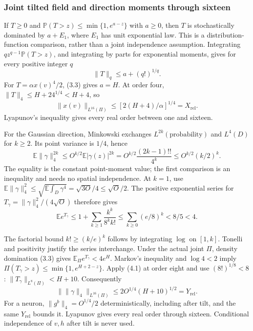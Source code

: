 \documentclass[11pt]{article}
\theoremstyle{plain}
\theoremstyle{definition}
\theoremstyle{remark}
\newcommand{\E}{\mathbb{E}}
\newcommand{\PP}{\mathbb{P}}
\begin{document}
\subsubsection{Joint tilted field and direction moments through sixteen}
If $T\ge0$ and $\PP(T>z)\le\min\{1,e^{a-z}\}$ with $a\ge0$, then
$T$ is stochastically dominated by $a+E_1$, where $E_1$ has unit
exponential law. This is a distribution-function comparison, rather than
a joint independence assumption. Integrating
$qz^{q-1}\PP(T>z)$, and integrating by parts for exponential moments,
gives for every positive integer $q$
\begin{equation}\|T\|_q\le a+(q!)^{1/q}.\tag{4.1}\end{equation}
For $T=\alpha x(v)^4/2$, (3.3) gives $a=H$. At order four,
$\|T\|_4\le H+24^{1/4}<H+4$, so
\begin{equation}
 \|x(v)\|_{L^{16}(\Pi)}\le[2(H+4)/\alpha]^{1/4}=X_{\mathrm{rel}}.\tag{4.2}
\end{equation}
Lyapunov's inequality gives every real order between one and sixteen.

For the Gaussian direction, Minkowski exchanges
$L^{2k}(\text{probability})$ and $L^4(D)$ for $k\ge2$.
Its point variance is $1/4$, hence
\begin{equation}
 \E\|\gamma\|_4^{2k}
 \le O^{k/2}\E|\gamma(z)|^{2k}
 =O^{k/2}\frac{(2k-1)!!}{4^k}
 \le O^{k/2}(k/2)^k.\tag{4.3}
\end{equation}
The equality is the constant point-moment value; the first comparison is
an inequality and needs no spatial independence. At $k=1$, use
$\E\|\gamma\|_4^2\le\sqrt{\E\int_D\gamma^4}
=\sqrt{3O}/4\le\sqrt O/2$. The positive exponential series for
$T_\gamma=\|\gamma\|_4^2/(4\sqrt O)$ therefore gives
\begin{equation}
 \E e^{T_\gamma}\le1+\sum_{k\ge1}\frac{k^k}{8^kk!}
 \le\sum_{k\ge0}(e/8)^k<8/5<4.\tag{4.4}
\end{equation}

The factorial bound $k!\ge(k/e)^k$ follows by integrating $\log$ on
$[1,k]$. Tonelli and positivity justify the series interchange.
Under the actual joint $\Pi$, density domination (3.3) gives
$\E_\Pi e^{T_\gamma}<4e^H$. Markov's inequality and $\log4<2$ imply
$\Pi(T_\gamma>z)\le\min\{1,e^{H+2-z}\}$.
Apply (4.1) at order eight and use $(8!)^{1/8}<8$:
$\|T_\gamma\|_{L^8(\Pi)}<H+10$. Consequently
\begin{equation}
 \|\|\gamma\|_4\|_{L^{16}(\Pi)}
 \le2O^{1/4}(H+10)^{1/2}=Y_{\mathrm{rel}}.\tag{4.5}
\end{equation}
For a neuron, $\|g^b\|_4=O^{1/4}/2$ deterministically, including after
tilt, and the same $Y_{\mathrm{rel}}$ bounds it. Lyapunov gives every
real order through sixteen. Conditional independence of $v,h$ after
tilt is never used.
\end{document}

